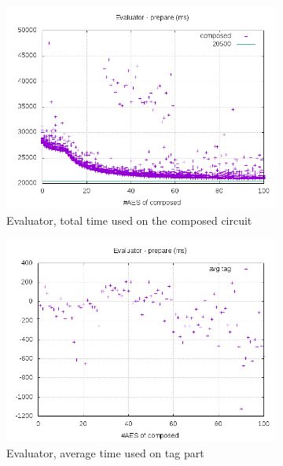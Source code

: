 \documentclass[10pt,a4paper]{article}
\begin{document}
\begin{figure}[h]
    \begin{subfigure}[t]{0.3\textwidth}
        \includegraphics[width=\textwidth]{eval_prepare_plots}
        \caption{Evaluator, total time used on the composed circuit}
    \end{subfigure}
    \begin{subfigure}[t]{0.3\textwidth}
        \includegraphics[width=\textwidth]{eval_prepare_avg}
        \caption{Evaluator, average time used on tag part}
    \end{subfigure}
    \begin{subfigure}[t]{0.3\textwidth}

\end{subfigure}
\end{figure}
\end{document}
